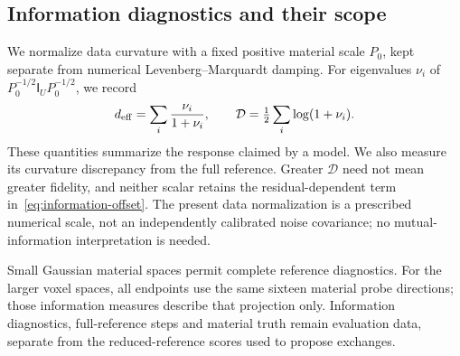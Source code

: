 \subsection{Information diagnostics and their scope}
We normalize data curvature with a fixed positive material scale $P_0$, kept separate from numerical Levenberg--Marquardt damping. For eigenvalues $\nu_i$ of $P_0^{-1/2}\mathsf I_UP_0^{-1/2}$, we record
\begin{equation}
 d_{\rm eff}=
 \sum_i\frac{\nu_i}{1+\nu_i},\qquad
 \mathcal D=\tfrac12\sum_i\log(1+\nu_i).
\end{equation}
These quantities summarize the response claimed by a model. We also measure its curvature discrepancy from the full reference. Greater $\mathcal D$ need not mean greater fidelity, and neither scalar retains the residual-dependent term in~\eqref{eq:information-offset}. The present data normalization is a prescribed numerical scale, not an independently calibrated noise covariance; no mutual-information interpretation is needed.

Small Gaussian material spaces permit complete reference diagnostics. For the larger voxel spaces, all endpoints use the same sixteen material probe directions; those information measures describe that projection only. Information diagnostics, full-reference steps and material truth remain evaluation data, separate from the reduced-reference scores used to propose exchanges.
